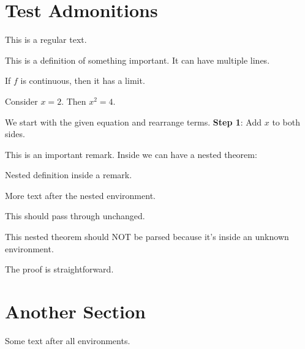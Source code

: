 \documentclass{article}
\begin{document}
\section{Test Admonitions}

This is a regular text.

\begin{definition}
This is a definition of something important.
It can have multiple lines.
\end{definition}

\begin{theorem}
If $f$ is continuous, then it has a limit.
\end{theorem}

\begin{exemple}
Consider $x = 2$. Then $x^2 = 4$.
\end{exemple}

\begin{solution}
We start with the given equation and rearrange terms.
\textbf{Step 1}: Add $x$ to both sides.
\end{solution}

\begin{remarque}
This is an important remark.
Inside we can have a nested theorem:
\begin{definition}
Nested definition inside a remark.
\end{definition}
More text after the nested environment.
\end{remarque}

\begin{unknownenv}
This should pass through unchanged.
\begin{theorem}
This nested theorem should NOT be parsed because it's inside an unknown environment.
\end{theorem}
\end{unknownenv}

\begin{preuve}
The proof is straightforward.
\end{preuve}

\section{Another Section}
Some text after all environments.
\end{document}

